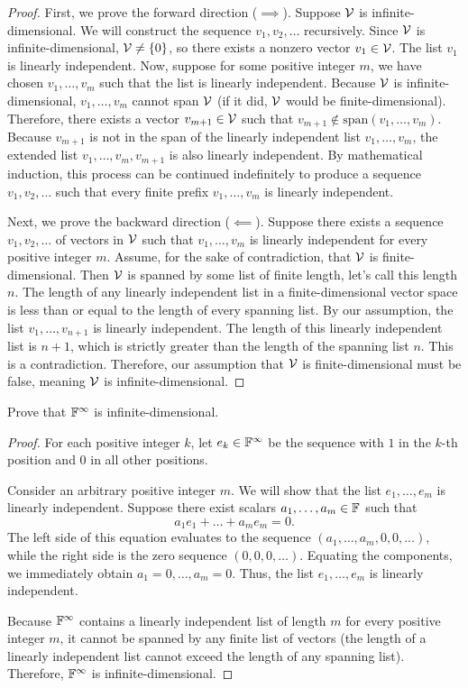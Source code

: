 \begin{proof}
	First, we prove the forward direction ($\implies$). Suppose $\mathcal{V}$ is infinite-dimensional. We will construct the sequence $v_1, v_2, \dots$ recursively. 
	Since $\mathcal{V}$ is infinite-dimensional, $\mathcal{V} \neq \{0\}$, so there exists a nonzero vector $v_1 \in \mathcal{V}$. The list $v_1$ is linearly independent. 
	Now, suppose for some positive integer $m$, we have chosen $v_1, \dots, v_m$ such that the list is linearly independent. Because $\mathcal{V}$ is infinite-dimensional, $v_1, \dots, v_m$ cannot span $\mathcal{V}$ (if it did, $\mathcal{V}$ would be finite-dimensional). Therefore, there exists a vector $v_{m+1} \in \mathcal{V}$ such that $v_{m+1} \notin \text{span}(v_1, \dots, v_m)$. Because $v_{m+1}$ is not in the span of the linearly independent list $v_1, \dots, v_m$, the extended list $v_1, \dots, v_m, v_{m+1}$ is also linearly independent. By mathematical induction, this process can be continued indefinitely to produce a sequence $v_1, v_2, \dots$ such that every finite prefix $v_1, \dots, v_m$ is linearly independent.
	
	Next, we prove the backward direction ($\impliedby$). Suppose there exists a sequence $v_1, v_2, \dots$ of vectors in $\mathcal{V}$ such that $v_1, \dots, v_m$ is linearly independent for every positive integer $m$. Assume, for the sake of contradiction, that $\mathcal{V}$ is finite-dimensional. Then $\mathcal{V}$ is spanned by some list of finite length, let's call this length $n$. 
	The length of any linearly independent list in a finite-dimensional vector space is less than or equal to the length of every spanning list. By our assumption, the list $v_1, \dots, v_{n+1}$ is linearly independent. The length of this linearly independent list is $n+1$, which is strictly greater than the length of the spanning list $n$. This is a contradiction. Therefore, our assumption that $\mathcal{V}$ is finite-dimensional must be false, meaning $\mathcal{V}$ is infinite-dimensional.
\end{proof}
\begin{question}
	Prove that $\mathbb{F}^\infty$ is infinite-dimensional.
\end{question}
\begin{proof}
	For each positive integer $k$, let $e_k \in \mathbb{F}^\infty$ be the sequence with $1$ in the $k$-th position and $0$ in all other positions. 
	
	Consider an arbitrary positive integer $m$. We will show that the list $e_1, \dots, e_m$ is linearly independent. Suppose there exist scalars $a_1, \dots, a_m \in \mathbb{F}$ such that
	\[
	a_1 e_1 + \dots + a_m e_m = 0.
	\]
	The left side of this equation evaluates to the sequence $(a_1, \dots, a_m, 0, 0, \dots)$, while the right side is the zero sequence $(0, 0, 0, \dots)$. Equating the components, we immediately obtain $a_1 = 0, \dots, a_m = 0$. Thus, the list $e_1, \dots, e_m$ is linearly independent.
	
	Because $\mathbb{F}^\infty$ contains a linearly independent list of length $m$ for every positive integer $m$, it cannot be spanned by any finite list of vectors (the length of a linearly independent list cannot exceed the length of any spanning list). Therefore, $\mathbb{F}^\infty$ is infinite-dimensional.
\end{proof}
